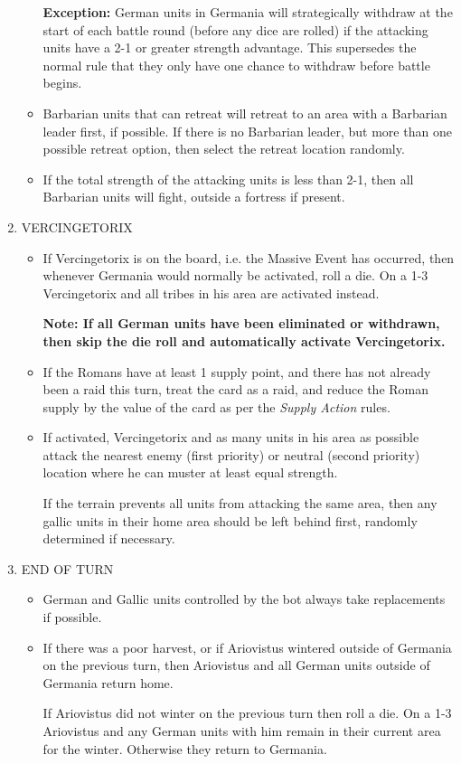 \begin{enumerate}
\begin{itemize}
    \textbf{Exception:} German units in Germania will strategically withdraw at the start of each battle round (before any dice are rolled) if the attacking units have a 2-1 or greater strength advantage. This supersedes the normal rule that they only have one chance to withdraw before battle begins.
    \item Barbarian units that can retreat will retreat to an area with a Barbarian leader first, if possible. If there is no Barbarian leader, but more than one possible retreat option, then select the retreat location randomly.
    \item If the total strength of the attacking units is less than 2-1, then all Barbarian units will fight, outside a fortress if present.
  \end{itemize}
  
  \item VERCINGETORIX
  \begin{itemize}
    \item If Vercingetorix is on the board, i.e. the Massive Event has occurred, then whenever Germania would normally be activated, roll a die. On a 1-3 Vercingetorix and all tribes in his area are activated instead.
    
    \textbf{Note: If all German units have been eliminated or withdrawn, then skip the die roll and automatically activate Vercingetorix.}
    
    \item If the Romans have at least 1 supply point, and there has not already been a raid this turn, treat the card as a raid, and reduce the Roman supply by the value of the card as per the \textit{Supply Action} rules.
    
    \item If activated, Vercingetorix and as many units in his area as possible attack the nearest enemy (first priority) or neutral (second priority) location where he can muster at least equal strength.
    
    If the terrain prevents all units from attacking the same area, then any gallic units in their home area should be left behind first, randomly determined if necessary.
  \end{itemize}
  
  \item END OF TURN
  \begin{itemize}
    \item German and Gallic units controlled by the bot always take replacements if possible.
    \item If there was a poor harvest, or if Ariovistus wintered outside of Germania on the previous turn, then Ariovistus and all German units outside of Germania return home.
    
    If Ariovistus did not winter on the previous turn then roll a die. On a 1-3 Ariovistus and any German units with him remain in their current area for the winter. Otherwise they return to Germania.
  \end{itemize}
\end{enumerate}

